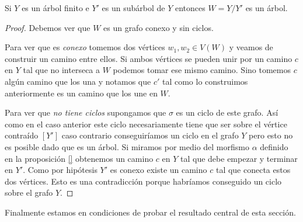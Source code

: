 \documentclass[tesis.tex]{subfiles}
\begin{document}
\begin{lema}\label{lema_subarbol_conexo}
	Si $Y$ es un árbol finito e $Y'$ es un subárbol de $Y$ entonces $W=Y/Y'$ es un árbol. 
\end{lema} 
\begin{proof}
	Debemos ver que $W$ es un grafo conexo y sin ciclos.
	
	Para ver que es \textit{conexo} tomemos dos vértices $w_1,w_2 \in V(W)$ y veamos de construir un camino entre ellos.
	Si ambos vértices se pueden unir por un camino $c$ en $Y$ tal que no interseca a $W$ podemos tomar ese mismo camino.
	Sino tomemos $c$ algún camino que los una y notamos que $c'$ tal como lo construimos anteriormente es un camino que los une en $W$.
	
	Para ver que \textit{no tiene ciclos} supongamos que $\sigma$ es un ciclo de este grafo.
	Así como en el caso anterior este ciclo necesariamente tiene que ser sobre el vértice contraído $[Y']$ caso contrario conseguiríamos un ciclo en el grafo $Y$ pero esto no es posible dado que es un árbol.
	Si miramos por medio del morfismo $\alpha$ definido en la proposición \ref{} obtenemos un camino $c$ en $Y$ tal que debe empezar y terminar en $Y'$. 
	Como por hipótesis $Y'$ es conexo existe un camino $c$ tal que conecta estos dos vértices. 
	Esto es una contradicción porque habríamos conseguido un ciclo sobre el grafo $Y$. 
\end{proof}


Finalmente estamos en condiciones de probar el resultado central de esta sección. 
\end{document}

